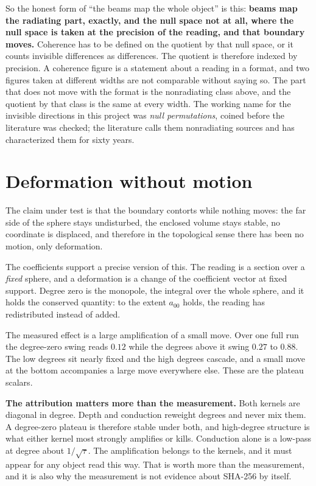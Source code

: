 So the honest form of ``the beams map the whole object'' is this: \textbf{beams map the radiating part, exactly, and the null space not at all, where the null space is taken at the precision of the reading, and that boundary moves.} Coherence has to be defined on the quotient by that null space, or it counts invisible differences as differences. The quotient is therefore indexed by precision. A coherence figure is a statement about a reading in a format, and two figures taken at different widths are not comparable without saying so. The part that does not move with the format is the nonradiating class above, and the quotient by that class is the same at every width. The working name for the invisible directions in this project was \emph{null permutations}, coined before the literature was checked; the literature calls them nonradiating sources and has characterized them for sixty years.

\section{Deformation without motion}

The claim under test is that the boundary contorts while nothing moves: the far side of the sphere stays undisturbed, the enclosed volume stays stable, no coordinate is displaced, and therefore in the topological sense there has been no motion, only deformation.

The coefficients support a precise version of this. The reading is a section over a \emph{fixed} sphere, and a deformation is a change of the coefficient vector at fixed support. Degree zero is the monopole, the integral over the whole sphere, and it holds the conserved quantity: to the extent \(a_{00}\) holds, the reading has redistributed instead of added.

The measured effect is a large amplification of a small move. Over one full run the degree-zero swing reads \(0.12\) while the degrees above it swing \(0.27\) to \(0.88\). The low degrees sit nearly fixed and the high degrees cascade, and a small move at the bottom accompanies a large move everywhere else. These are the plateau scalars.

\textbf{The attribution matters more than the measurement.} Both kernels are diagonal in degree. Depth and conduction reweight degrees and never mix them. A degree-zero plateau is therefore stable under both, and high-degree structure is what either kernel most strongly amplifies or kills. Conduction alone is a low-pass at degree about \(1/\sqrt{\tau}\). The amplification belongs to the kernels, and it must appear for any object read this way. That is worth more than the measurement, and it is also why the measurement is not evidence about SHA-256 by itself.


